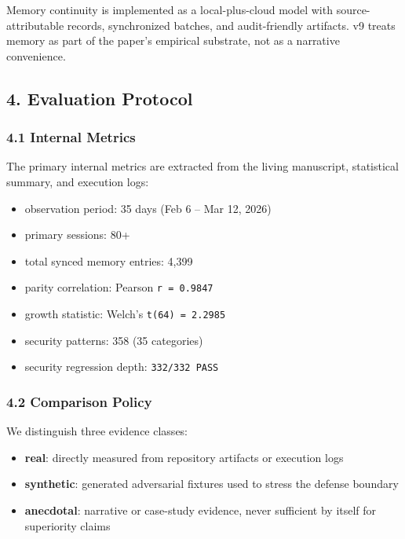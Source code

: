 \documentclass[
]{article}
\providecommand{\tightlist}{%
  \setlength{\itemsep}{0pt}\setlength{\parskip}{0pt}}
\begin{document}
Memory continuity is implemented as a local-plus-cloud model with source-attributable records, synchronized batches, and audit-friendly artifacts. v9 treats memory as part of the paper's empirical substrate, not as a narrative convenience.

\subsection{4. Evaluation Protocol}\label{evaluation-protocol}

\subsubsection{4.1 Internal Metrics}\label{internal-metrics}

The primary internal metrics are extracted from the living manuscript, statistical summary, and execution logs:

\begin{itemize}
\tightlist
\item
  observation period: 35 days (Feb 6 -- Mar 12, 2026)
\item
  primary sessions: 80+
\item
  total synced memory entries: 4,399
\item
  parity correlation: Pearson \texttt{r\ =\ 0.9847}
\item
  growth statistic: Welch's \texttt{t(64)\ =\ 2.2985}
\item
  security patterns: 358 (35 categories)
\item
  security regression depth: \texttt{332/332\ PASS}
\end{itemize}

\subsubsection{4.2 Comparison Policy}\label{comparison-policy}

We distinguish three evidence classes:

\begin{itemize}
\tightlist
\item
  \textbf{real}: directly measured from repository artifacts or execution logs
\item
  \textbf{synthetic}: generated adversarial fixtures used to stress the defense boundary
\item
  \textbf{anecdotal}: narrative or case-study evidence, never sufficient by itself for superiority claims
\end{itemize}
\end{document}
